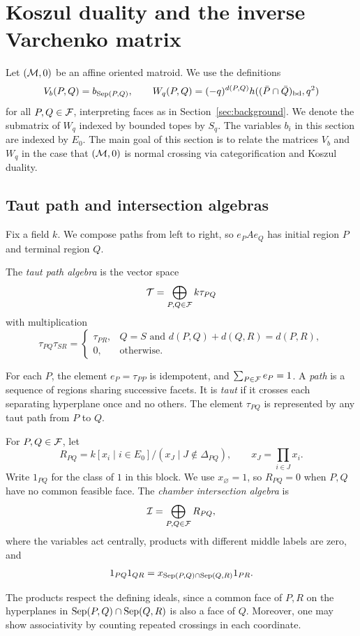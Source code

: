 \section{Koszul duality and the inverse Varchenko matrix}\label{sec:koszul}

Let $(\mathcal M,0)$ be an affine oriented matroid. We use the definitions
\[
 V_b(P,Q)=b_{\operatorname{Sep}(P,Q)},\qquad
 W_q(P,Q)=(-q)^{d(P,Q)}h((\bar P\cap\bar Q)_{\mathrm{bd}},q^2)
\]
for all $P,Q\in\mathcal F$, interpreting faces as in
Section~\ref{sec:background}. We denote the submatrix of $W_q$ indexed by bounded topes by $S_q$. The variables $b_i$ in this section are indexed by $E_0$. The main goal of this section is to relate the matrices $V_b$ and $W_q$ in the case that $(\mathcal M,0)$ is normal crossing via categorification and Koszul duality.

\subsection{Taut path and intersection algebras}
Fix a field $k$. We compose paths from left to right, so $e_PAe_Q$
has initial region $P$ and terminal region $Q$.

\begin{definition}
The \emph{taut path algebra} is the vector space
\[
 \mathcal T=\bigoplus_{P,Q\in\mathcal F}k\tau_{PQ}
\]
with multiplication
\[
 \tau_{PQ}\tau_{SR}=
 \begin{cases}
  \tau_{PR},&Q=S\text{ and }d(P,Q)+d(Q,R)=d(P,R),\\
  0,&\text{otherwise}.
 \end{cases}
\]
\end{definition}

For each $P$, the element $e_P=\tau_{PP}$ is idempotent, and
$\sum_{P\in\mathcal F}e_P=1$. A \emph{path} is a sequence of regions
sharing successive facets. It is \emph{taut} if it crosses each
separating hyperplane once and no others. The element $\tau_{PQ}$
is represented by any taut path from $P$ to $Q$.

\begin{definition}
For $P,Q\in\mathcal F$, let
\[
 R_{PQ}=k[x_i\mid i\in E_0]/(x_J\mid J\notin\Delta_{PQ}),
 \qquad x_J=\prod_{i\in J}x_i.
\]
Write $1_{PQ}$ for the class of $1$ in this block. We use
$x_\varnothing=1$, so $R_{PQ}=0$ when $P,Q$ have no common feasible
face. The \emph{chamber intersection algebra} is
\[
 \mathcal I=\bigoplus_{P,Q\in\mathcal F}R_{PQ},
\]
where the variables act centrally, products with different middle
labels are zero, and
\begin{equation}\label{eq:intersection-product}
 1_{PQ}1_{QR}=x_{\operatorname{Sep}(P,Q)\cap\operatorname{Sep}(Q,R)}1_{PR}.
\end{equation}
\end{definition}
The products respect the defining ideals, since a common face of $P,R$
on the hyperplanes in $\operatorname{Sep}(P,Q)\cap\operatorname{Sep}(Q,R)$ is also a face of
$Q$. Moreover, one may show associativity by counting repeated crossings in each coordinate.

